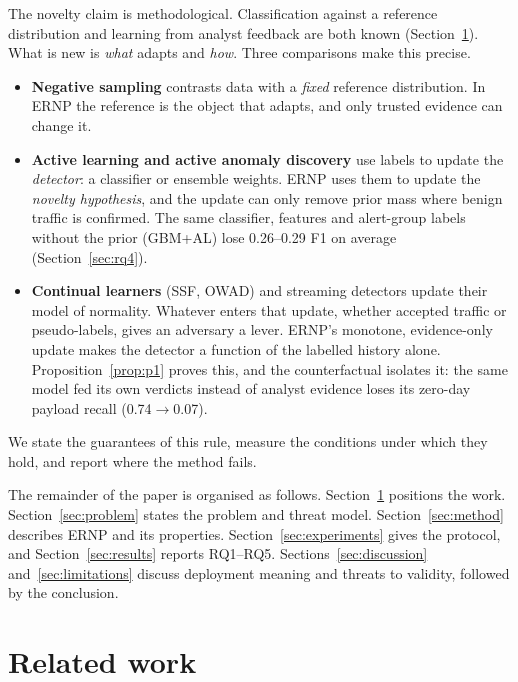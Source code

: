 \documentclass[a4paper,fleqn]{cas-dc}
\newcommand{\ERNP}{ERNP\xspace}
\begin{document}
The novelty claim is methodological. Classification against a reference distribution and learning from analyst feedback are both known (Section~\ref{sec:related}). What is new is \emph{what} adapts and \emph{how}. Three comparisons make this precise.
\begin{itemize}
  \item \textbf{Negative sampling} \cite{sipple2020negative} contrasts data with a \emph{fixed} reference distribution. In \ERNP the reference is the object that adapts, and only trusted evidence can change it.
  \item \textbf{Active learning and active anomaly discovery} \cite{settles2009active,das2016aad} use labels to update the \emph{detector}: a classifier or ensemble weights. \ERNP uses them to update the \emph{novelty hypothesis}, and the update can only remove prior mass where benign traffic is confirmed. The same classifier, features and alert-group labels without the prior (GBM+AL) lose 0.26--0.29 F1 on average (Section~\ref{sec:rq4}).
  \item \textbf{Continual learners} (SSF, OWAD) and streaming detectors update their model of normality. Whatever enters that update, whether accepted traffic or pseudo-labels, gives an adversary a lever. \ERNP's monotone, evidence-only update makes the detector a function of the labelled history alone. Proposition~\ref{prop:p1} proves this, and the counterfactual isolates it: the same model fed its own verdicts instead of analyst evidence loses its zero-day payload recall (0.74$\rightarrow$0.07).
\end{itemize}
We state the guarantees of this rule, measure the conditions under which they hold, and report where the method fails.

The remainder of the paper is organised as follows. Section~\ref{sec:related} positions the work. Section~\ref{sec:problem} states the problem and threat model. Section~\ref{sec:method} describes \ERNP and its properties. Section~\ref{sec:experiments} gives the protocol, and Section~\ref{sec:results} reports RQ1--RQ5. Sections~\ref{sec:discussion} and~\ref{sec:limitations} discuss deployment meaning and threats to validity, followed by the conclusion.

\section{Related work}
\label{sec:related}
\end{document}
